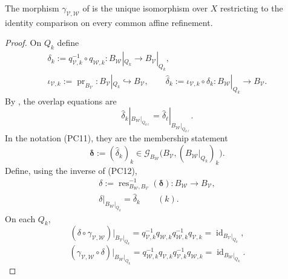 \begin{proposition}
  \label{prop:nagata-global-blowup-cover-independent}
  \lean{}

  The morphism $\gamma_{\mathcal V,\mathcal W}$ of
   is the unique isomorphism
  over $X$ restricting
  to the identity comparison on every common affine refinement.
\end{proposition}

\begin{proof}
  On $Q_k$ define
  \[
  \begin{gathered}
    \delta_k:=q_{\mathcal V,k}^{-1}\circ q_{\mathcal W,k}
      \colon B_{\mathcal W}|_{Q_k}\to B_{\mathcal V}|_{Q_k},\\
    \iota_{\mathcal V,k}:=\operatorname{pr}_{B_{\mathcal V}}\colon
      B_{\mathcal V}|_{Q_k}\hookrightarrow B_{\mathcal V},\qquad
    \widehat\delta_k:=\iota_{\mathcal V,k}\circ\delta_k
      \colon B_{\mathcal W}|_{Q_k}\to B_{\mathcal V}.
  \end{gathered}
  \]
  By ,
  the overlap equations are
  \[
    \widehat\delta_k|_{B_{\mathcal W}|_{Q_{k\ell}}}
      =\widehat\delta_\ell|_{B_{\mathcal W}|_{Q_{k\ell}}}.
  \]
  In the notation (PC11), they are the membership statement
  \[
    \mathbf\delta:=(\widehat\delta_k)_k
      \in\mathscr G_{B_{\mathcal W}}
        \bigl(B_{\mathcal V},(B_{\mathcal W}|_{Q_k})_k\bigr).
  \]
  Define, using the inverse of (PC12),
  \[
  \begin{gathered}
    \delta:=\operatorname{res}_{B_{\mathcal W},B_{\mathcal V}}^{-1}
      (\mathbf\delta)\colon B_{\mathcal W}\to B_{\mathcal V},\\
    \delta|_{B_{\mathcal W}|_{Q_k}}=\widehat\delta_k
      \qquad(k).
  \end{gathered}
  \]
  On each $Q_k$,
  \[
    (\delta\circ\gamma_{\mathcal V,\mathcal W})
      |_{B_{\mathcal V}|_{Q_k}}
      =q_{\mathcal V,k}^{-1}q_{\mathcal W,k}
        q_{\mathcal W,k}^{-1}q_{\mathcal V,k}
      =\operatorname{id}_{B_{\mathcal V}|_{Q_k}},
  \]
  \[
    (\gamma_{\mathcal V,\mathcal W}\circ\delta)
      |_{B_{\mathcal W}|_{Q_k}}
      =q_{\mathcal W,k}^{-1}q_{\mathcal V,k}
        q_{\mathcal V,k}^{-1}q_{\mathcal W,k}
      =\operatorname{id}_{B_{\mathcal W}|_{Q_k}}.
\]
\end{proof}
